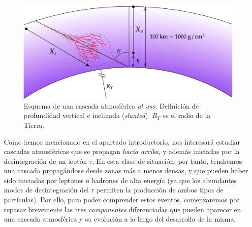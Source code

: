 \documentclass[12 pt, a4paper]{article} %
\numberwithin{equation}{section}
\numberwithin{figure}{section}
\numberwithin{table}{section}
\begin{document}
\begin{figure}[H]
	\centering
	\includegraphics[width=.7\linewidth]{figures/cascadas/shower_params}
	\caption{Esquema de una cascada atmosférica \textit{al uso}. Definición de profundidad vertical e inclinada (\textit{slanted}). $R_T$ es el radio de la Tierra.}
	\label{shower_params}
\end{figure}

Como hemos mencionado en el apartado introductorio, nos interesará estudiar cascadas atmosféricas que se propagan \textit{hacia arriba}, y además iniciadas por la desintegración de un leptón $\tau$. En esta clase de situación, por tanto, tendremos una cascada propagándose desde zonas más a menos densas, y que pueden haber sido iniciadas por leptones o hadrones de alta energía (ya que los abundantes modos de desintegración del $\tau$ permiten la producción de ambos tipos de partículas). Por ello, para poder comprender estos eventos, comenzaremos por repasar brevemente las tres \textit{componentes} diferenciadas que pueden aparecer en una cascada atmosférica y su evolución a lo largo del desarrollo de la misma.
\end{document}
